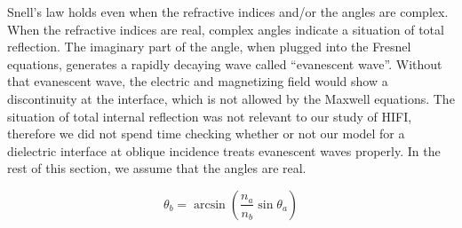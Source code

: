 Snell's law holds even when the refractive indices and/or the angles are complex.
When the refractive indices are real, complex angles indicate a situation of total reflection.
The imaginary part of the angle, when plugged into the Fresnel equations, generates a rapidly decaying wave called ``evanescent wave''.
Without that evanescent wave, the electric and magnetizing field would show a discontinuity at the interface, which is not allowed by the Maxwell equations.
The situation of total internal reflection was not relevant to our study of HIFI, therefore we did not spend time checking whether or not our model for a dielectric interface at oblique incidence treats evanescent waves properly.
In the rest of this section, we assume that the angles are real.

\begin{equation}
    \theta_b = \arcsin
            \left(
                \frac{n_a}{n_b}
                \sin \theta_a
            \right)
    \label{eq:snell_thetab}
\end{equation}

